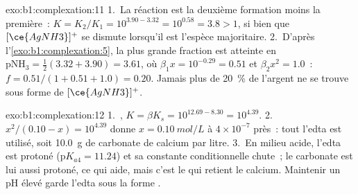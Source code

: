 \begin{solution}{exo:b1:complexation:11}
1.~La réaction est la deuxième formation moins la première~:
$K = K_2/K_1 =
10^{3.90 - 3.32} = 10^{0.58} = 3.8 > 1$, si bien que $[\ce{AgNH3}]^{+}$
se dismute lorsqu'il est l'espèce majoritaire.
2.~D'après l'\cref{exo:b1:complexation:5}, la plus grande fraction est
atteinte en
$\mathrm{pNH_3} = \frac12(3.32 + 3.90) = 3.61$, où $\beta_1 x = 10^{-0.29}
= 0.51$ et $\beta_2x^2 = 1.0$~: $f = 0.51/(1 + 0.51 + 1.0) = 0.20$. Jamais
plus de \qty{20}{\percent} de l'argent ne se trouve sous forme de
$[\ce{AgNH3}]^{+}$.
\end{solution}

\begin{solution}{exo:b1:complexation:12}
1.~, $K = \beta K_s = 10^{12.69 -
8.30} = 10^{4.39}$.
2.~$x^2/(0.10 - x) = 10^{4.39}$ donne $x = \qty{0.10}{mol/L}$ à
$4 \times 10^{-7}$ près~: tout l'edta est utilisé, soit \qty{10.0}{g} de
carbonate de calcium par litre.
3.~En milieu acide, l'edta est protoné ($\mathrm{p}K_{a4} = 11.24$) et
sa constante conditionnelle chute~; le carbonate est lui aussi protoné,
ce qui aide, mais c'est le  qui retient le calcium. Maintenir un
pH élevé garde l'edta sous la forme .
\end{solution}

